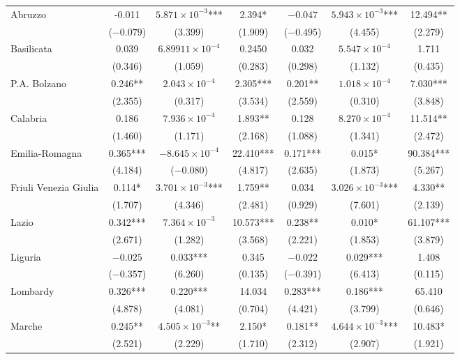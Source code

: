 \documentclass[12pt]{article}
\begin{document}
\begin{appendices}
\begin{longtable}{@{}lcccccc@{}}
            Abruzzo & -0.011 & $5.871 \times 10^{-3}$*** & 2.394* & $-0.047$ & $5.943 \times 10^{-3}$*** & 12.494** \\ 
             & ($-0.079$) & (3.399) & (1.909) & ($-0.495$) & (4.455) & (2.279) \\ 
            Basilicata & 0.039 & $6.89911 \times 10^{-4}$ & 0.2450 & 0.032 & $5.547 \times 10^{-4}$ & 1.711 \\ 
             & (0.346) & (1.059) & (0.283) & (0.298) & (1.132) & (0.435) \\ 
            P.A. Bolzano & 0.246** & $2.043 \times 10^{-4}$ & 2.305*** & 0.201** & $1.018 \times 10^{-4}$ & 7.030*** \\ 
             & (2.355) & (0.317) & (3.534) & (2.559) & (0.310) & (3.848) \\ 
            Calabria & 0.186 & $7.936 \times 10^{-4}$ & 1.893** & 0.128 & $8.270 \times 10^{-4}$ & 11.514** \\ 
             & (1.460) & (1.171) & (2.168) & (1.088) & (1.341) & (2.472) \\ 
            Emilia-Romagna & 0.365*** & $-8.645 \times 10^{-4}$ & 22.410*** & 0.171*** & 0.015* & 90.384*** \\ 
             & (4.184) & ($-0.080$) & (4.817) & (2.635) & (1.873) & (5.267) \\ 
            Friuli Venezia Giulia & 0.114* & $3.701 \times 10^{-3}$*** & 1.759** & 0.034 & $3.026 \times 10^{-3}$*** & 4.330** \\ 
             & (1.707) & (4.346) & (2.481) & (0.929) & (7.601) & (2.139) \\ 
            Lazio & 0.342*** & $7.364 \times 10^{-3}$ & 10.573*** & 0.238** & 0.010* & 61.107*** \\ 
             & (2.671) & (1.282) & (3.568) & (2.221) & (1.853) & (3.879) \\ 
            Liguria & $-0.025$ & 0.033*** & 0.345 & $-0.022$ & 0.029*** & 1.408 \\ 
             & ($-0.357$) & (6.260) & (0.135) & ($-0.391$) & (6.413) & (0.115) \\ 
            Lombardy & 0.326*** & 0.220*** & 14.034 & 0.283*** & 0.186*** & 65.410 \\ 
             & (4.878) & (4.081) & (0.704) & (4.421) & (3.799) & (0.646) \\ 
            Marche & 0.245** & $4.505 \times 10^{-3}$** & 2.150* & 0.181** & $4.644 \times 10^{-3}$*** & 10.483* \\ 
             & (2.521) & (2.229) & (1.710) & (2.312) & (2.907) & (1.921) \\ 

\end{longtable}
\end{appendices}
\end{document}
